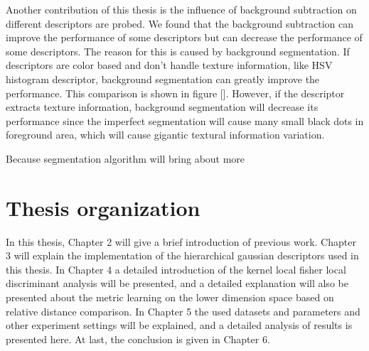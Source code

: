 Another contribution of this thesis is the influence of background subtraction on different descriptors are probed. We found that the background subtraction can improve the performance of some descriptors but can decrease the performance of some descriptors. The reason for this is caused by background segmentation. If descriptors are color based and don't handle texture information, like HSV histogram descriptor, background segmentation can greatly improve the performance. This comparison is shown in figure []. However, if the descriptor extracts texture information, background segmentation will decrease its performance since the imperfect segmentation will cause many small black dots in foreground area, which will cause gigantic textural information variation. 


Because segmentation algorithm will bring about more 

\section{Thesis organization}
In this thesis, Chapter 2 will give a brief introduction of previous work. Chapter 3 will explain the implementation of the hierarchical gaussian descriptors used in this thesis. In Chapter 4 a detailed introduction of the kernel local fisher local discriminant analysis will be presented, and a detailed explanation will also be presented about the metric learning on the lower dimension space based on relative distance comparison.
In Chapter 5 the used datasets and parameters and other experiment settings will be explained, and a detailed analysis of results is presented here. At last, the conclusion is given in Chapter 6.




